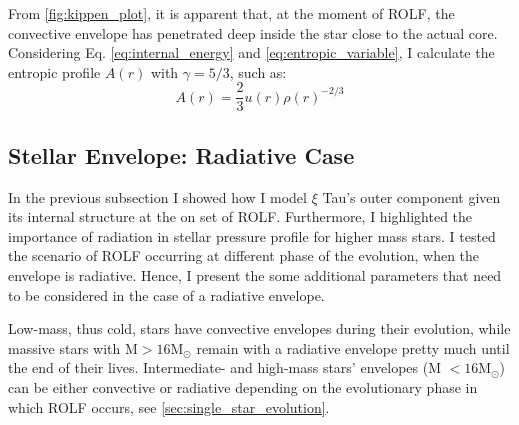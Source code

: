 From \cref{fig:kippen_plot}, it is apparent that, at the moment of ROLF, the convective envelope has penetrated deep inside the star close to the actual core. Considering Eq. \eqref{eq:internal_energy} and \eqref{eq:entropic_variable}, I calculate the entropic profile $A(r)$ with $\gamma = 5/3$, such as:
\begin{equation}\label{eq:entropic_variable_2}
    A(r) = \frac{2}{3} u(r) \rho(r)^{-2/3}
\end{equation}



\subsection{Stellar Envelope: Radiative Case}\label{sub:envelope_rad}

In the previous subsection I showed how I model $\xi$ Tau's outer component given its internal structure at the on set of ROLF. Furthermore, I highlighted the importance of radiation in stellar pressure profile for higher mass stars. I tested the scenario of ROLF occurring at different phase of the evolution, when the envelope is radiative. Hence, I present the some additional parameters that need to be considered in the case of a radiative envelope. 

Low-mass, thus cold, stars have convective envelopes during their evolution, while massive stars with M$>16$M$_{\odot}$ remain with a radiative envelope pretty much until the end of their lives. Intermediate- and high-mass stars' envelopes (M  $<16$M$_{\odot}$) can be either convective or radiative depending on the evolutionary phase in which ROLF occurs, see \cref{sec:single_star_evolution}. 

